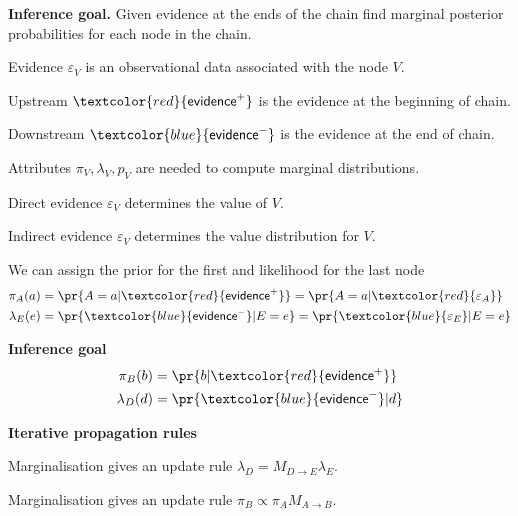 \documentclass[landscape,footrule]{foils}
\newcommand{\EVPOS}{\textcolor{red}{\mathsf{evidence}^+}}
\newcommand{\EVNEG}{\textcolor{blue}{\mathsf{evidence}^-}}
\begin{document}


\textbf{Inference goal.}
Given evidence at the ends of the chain find marginal posterior probabilities for each node in the chain.
\begin{triangles}
\item Evidence $\varepsilon_V$ is an observational data associated with the node $V$.
\item Upstream $\EVPOS$ is the evidence at the beginning of chain.
\item Downstream $\EVNEG$ is the evidence at the end of chain.
\item Attributes $\pi_V, \lambda_V, p_V$ are needed to compute marginal distributions. 
\end{triangles}



\vspace*{-0.5cm}

\begin{triangles}
\item Direct evidence $\varepsilon_V$ determines the value of $V$.
\item Indirect evidence $\varepsilon_V$ determines the value distribution for $V$. 
\item We can assign the prior for the first and likelihood for the last node
\begin{align*}
\pi_A(a)&=\pr{A=a|\EVPOS}=\pr{A=a|\textcolor{red}{\varepsilon_A}}\\
\lambda_E(e)&=\pr{\EVNEG|E=e}=\pr{\textcolor{blue}{\varepsilon_E}|E=e}
\end{align*}
\end{triangles}



 

\vspace*{-0.0cm}
\textbf{Inference goal}
\begin{align*}
\pi_B(b)&=\pr{b|\EVPOS}\\
\lambda_D(d)&=\pr{\EVNEG|d}
\end{align*}\vspace*{-1.5cm}


\textbf{Iterative propagation rules}
\begin{triangles}
\item Marginalisation gives an update rule $\lambda_D=M_{D\to E}\lambda_E$.
\item Marginalisation gives an update rule $\pi_B\propto \pi_A M_{A\to B}$.

\end{triangles}
\end{document}
